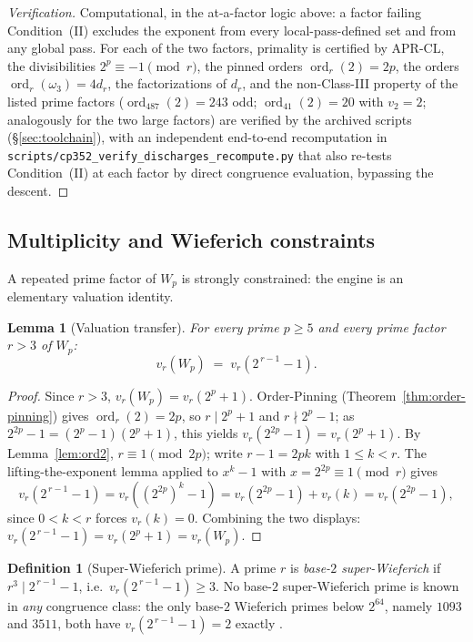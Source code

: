 \documentclass[11pt]{amsart}
\theoremstyle{plain}
\newtheorem{lemma}[theorem]{Lemma}
\theoremstyle{definition}
\newtheorem{definition}[theorem]{Definition}
\theoremstyle{remark}
\numberwithin{equation}{section}
\newcommand{\ord}{\operatorname{ord}}
\begin{document}
\begin{proof}[Verification]
Computational, in the at-a-factor logic above: a factor failing Condition~(II) excludes the exponent from every local-pass-defined set and from any global pass. For each of the two factors, primality is certified by APR-CL, the divisibilities $2^p \equiv -1 \pmod r$, the pinned orders $\ord_r(2) = 2p$, the orders $\ord_r(\omega_3) = 4 d_r$, the factorizations of $d_r$, and the non-Class-III property of the listed prime factors ($\ord_{487}(2) = 243$ odd; $\ord_{41}(2) = 20$ with $v_2 = 2$; analogously for the two large factors) are verified by the archived scripts (\S\ref{sec:toolchain}), with an independent end-to-end recomputation in \texttt{scripts/cp352\_verify\_discharges\_recompute.py} that also re-tests Condition~(II) at each factor by direct congruence evaluation, bypassing the descent.
\end{proof}

\subsection{Multiplicity and Wieferich constraints}\label{sec:wieferich}

A repeated prime factor of $W_p$ is strongly constrained: the engine is an elementary valuation identity.

\begin{lemma}[Valuation transfer]\label{lem:w1-valuation}
For every prime $p \geq 5$ and every prime factor $r > 3$ of $W_p$:
\[
  v_r(W_p) \;=\; v_r\!\left(2^{\,r-1} - 1\right).
\]
\end{lemma}

\begin{proof}
Since $r > 3$, $v_r(W_p) = v_r(2^p + 1)$. Order-Pinning (Theorem~\ref{thm:order-pinning}) gives $\ord_r(2) = 2p$, so $r \mid 2^p + 1$ and $r \nmid 2^p - 1$; as $2^{2p} - 1 = (2^p - 1)(2^p + 1)$, this yields $v_r(2^{2p} - 1) = v_r(2^p + 1)$. By Lemma~\ref{lem:ord2}, $r \equiv 1 \pmod{2p}$; write $r - 1 = 2 p k$ with $1 \leq k < r$. The lifting-the-exponent lemma applied to $x^k - 1$ with $x = 2^{2p} \equiv 1 \pmod r$ gives
\[
  v_r\!\left(2^{\,r-1} - 1\right) = v_r\!\left((2^{2p})^k - 1\right) = v_r(2^{2p} - 1) + v_r(k) = v_r(2^{2p} - 1),
\]
since $0 < k < r$ forces $v_r(k) = 0$. Combining the two displays: $v_r(2^{\,r-1} - 1) = v_r(2^p + 1) = v_r(W_p)$.
\end{proof}

\begin{definition}[Super-Wieferich prime]\label{def:super-wieferich}
A prime $r$ is \emph{base-$2$ super-Wieferich} if $r^3 \mid 2^{\,r-1} - 1$, i.e.\ $v_r(2^{\,r-1} - 1) \geq 3$. No base-$2$ super-Wieferich prime is known in \emph{any} congruence class: the only base-$2$ Wieferich primes below $2^{64}$, namely $1093$ and $3511$, both have $v_r(2^{\,r-1} - 1) = 2$ exactly \cite{ref:OEISWieferich}.
\end{definition}
\end{document}

